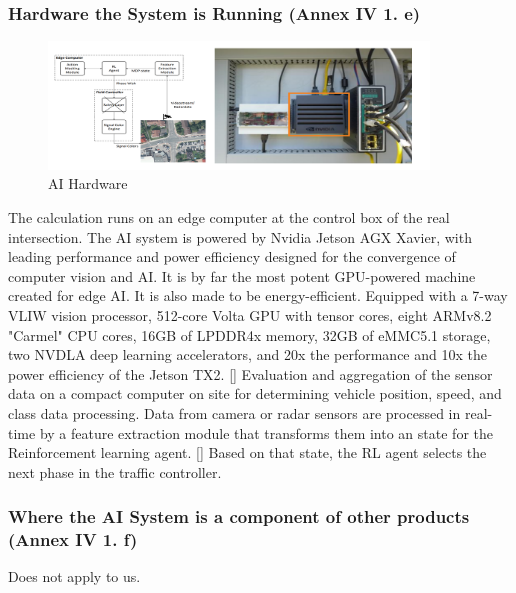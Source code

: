   \subsubsection{Hardware the System is Running (Annex IV 1. e)}
\begin{figure}[h]
        \centering
        \includegraphics[width=0.9\textwidth]{paper-template/figs/edge computer.png}
        \caption{AI Hardware}
        \label{fig:my_label}
        \end{figure} 
The calculation runs on an edge computer at the control box of the real intersection. The AI system is powered by Nvidia Jetson AGX Xavier, with leading performance and power efficiency designed for the convergence of computer vision and AI. It is by far the most potent GPU-powered machine created for edge AI. It is also made to be energy-efficient. Equipped with a 7-way VLIW vision processor, 512-core Volta GPU with tensor cores, eight ARMv8.2 "Carmel" CPU cores, 16GB of LPDDR4x memory, 32GB of eMMC5.1 storage, two NVDLA deep learning accelerators, and 20x the performance and 10x the power efficiency of the Jetson TX2. [\citet{NVIDIA_Jetson_AGX_2022}] 
Evaluation and aggregation of the sensor data on a compact computer on site for determining vehicle position, speed, and class data processing. Data from camera or radar sensors are processed in real-time by a feature extraction module that transforms them into an state for the Reinforcement learning agent. [\citet{(Muller_et}] Based on that state, the RL agent selects the next phase in the traffic controller.

  \subsubsection{Where the AI System is a component of other products (Annex IV 1. f)}
  Does not apply to us.
